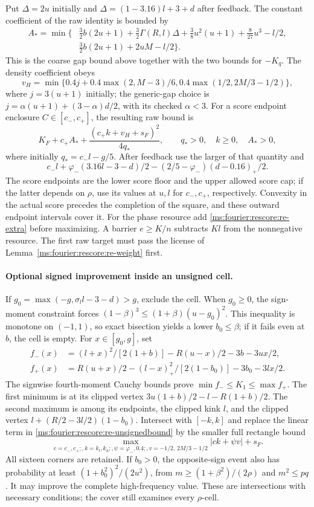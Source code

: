 Put $\Delta=2u$ initially and $\Delta=(1-3.16)l+3+d$ after feedback.
The constant coefficient of the raw identity is bounded by
\begin{align*}
 A_* =\min\bigl\{&\tfrac32b(2u+1)+\tfrac32\Gamma(R,l)\Delta
       +\tfrac38u^2(u+1)+\tfrac8{27}u^3-l/2,\\
      &\tfrac32b(2u+1)+2uM-l/2\bigr\}.
\end{align*}
This is the coarse gap bound above together with the two bounds for
$-K_q$. The density coefficient obeys
\[
 v_H=\min\{0.4j+0.4\max(2,M-3)/6,
                     0.4\max(1/2,2M/3-1/2)\},
\]
where $j=3(u+1)$ initially; the generic-gap choice is
$j=\alpha(u+1)+(3-\alpha)d/2$, with its checked $\alpha<3$.
For a score endpoint enclosure $C\in[c_-,c_+]$, the resulting raw
bound is
\begin{equation}\label{ms:fourier:rescore:re-unsignedbound}
 K_F+c_+A_*+\frac{(c_+k+v_H+s_F)^2}{4q_*},
 \qquad q_*>0,\quad k\ge0,\quad A_*>0,
\end{equation}
where initially $q_*=c_-l-g/5$. After feedback use the larger of that
quantity and
\[
 c_-l+\varphi_-(3.16l-3-d)/2
                  -(2/5-\varphi_-)(d-0.16)_+/2.
\]
The score endpoints are the lower score floor and the upper allowed
score cap; if the latter depends on $\rho$, use its values at $u,l$
for $c_-,c_+$, respectively. Convexity in the actual score precedes the
completion of the square, and these outward endpoint intervals cover it.
For the phase resource add \eqref{ms:fourier:rescore:re-extra} before maximizing. A barrier
$e\ge K/n$ subtracts $K l$ from the nonnegative resource. The first raw
target must pass the license of Lemma~\ref{ms:fourier:rescore:re-weight} first.

\paragraph{Optional signed improvement inside an unsigned cell.}
If $g_0=\max(-g,\sigma_l l-3-d)>g$, exclude the cell. When $g_0\ge0$,
the sign-moment constraint forces
$(1-\beta)^3\le(1+\beta)(u-g_0)^2$.
This inequality is monotone on $(-1,1)$, so exact bisection yields a
lower $b_0\le\beta$; if it fails even at $b$, the cell is empty.
For $x\in[g_0,g]$, set
\begin{align*}
 f_-(x)&=(l+x)^2/[2(1+b)]-R(u-x)/2-3b-3ux/2,\\
 f_+(x)&=R(u+x)/2-(l-x)_+^2/[2(1-b_0)]-3b_0-3lx/2.
\end{align*}
The signwise fourth-moment Cauchy bounds prove
$\min f_-\le K_1\le\max f_+$. The first minimum is at its clipped
vertex $3u(1+b)/2-l-R(1+b)/2$. The second maximum is among its endpoints,
the clipped kink $l$, and the clipped vertex
$l+(R/2-3l/2)(1-b_0)$. Intersect with $[-k,k]$ and replace the linear
term in \eqref{ms:fourier:rescore:re-unsignedbound} by the smaller full rectangle bound
\[
 \max_{c=c_-,c_+;,k=k_l,k_u;,\psi=\varphi_-,0.4;,
             v=-1/2,\,2M/3-1/2}|ck+\psi v|+s_F.
\]
All sixteen corners are retained. If $b_0>0$, the opposite-sign event
also has probability at least $(1+b_0^2)^2/(2u^2)$, from
$m\ge(1+\beta^2)/(2\rho)$ and $m^2\le pq$. It may improve the complete
high-frequency value. These are intersections with necessary conditions; the cover
still examines every $\rho$-cell.

